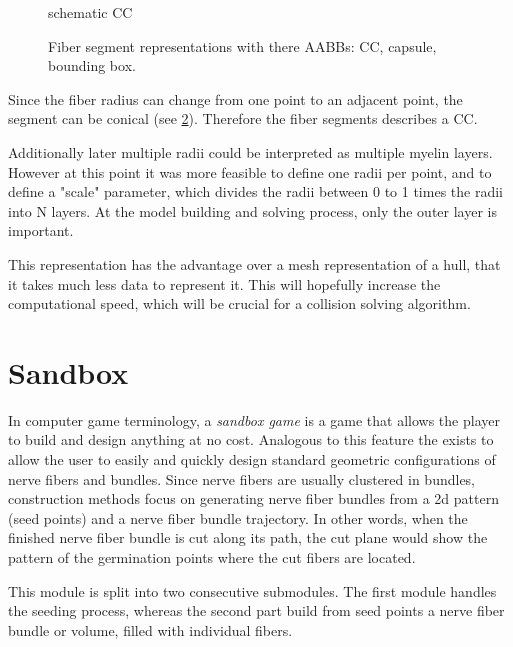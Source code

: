 % 
\begin{figure}[!t]
    \centering
    \setlength{\tikzwidth}{0.5\textwidth}
	\caption{schematic  \ac{CC}}
	\label{fig:conical}
\end{figure}
% 
\begin{figure}[!t]
    \centering
    \setlength{\tikzwidth}{0.75\textwidth}
    \tikzset{external/export=false}
	\caption[cc and co]{Fiber segment representations with there \acp{AABB}:  \ac{CC},  capsule,  bounding box.}
	\label{fig:conical_capsule}
\end{figure}
% 
Since the fiber radius can change from one point to an adjacent point, the segment can be conical (see \cref{fig:conical_capsule}).
Therefore the fiber segments describes a \ac{CC}.
\par
% 
Additionally later multiple radii could be interpreted as multiple myelin layers.
However at this point it was more feasible to define one radii per point, and to define a "scale" parameter, which divides the radii between 0 to 1 times the radii into N layers.
At the model building and solving process, only the outer layer is important.
\par
% 
This representation has the advantage over a mesh representation of a hull, that it takes much less data to represent it.
This will hopefully increase the computational speed, which will be crucial for a collision solving algorithm.
% 
\section{Sandbox}\label{sec:sandbox}
% 
In computer game terminology, a \textit{sandbox game} is a game that allows the player to build and design anything at no cost.
Analogous to this feature the  exists to allow the user to easily and quickly design standard geometric configurations of nerve fibers and bundles.
Since nerve fibers are usually clustered in bundles, construction methods focus on generating nerve fiber bundles from a 2d pattern (seed points) and a nerve fiber bundle trajectory.
In other words, when the finished nerve fiber bundle is cut along its path, the cut plane would show the pattern of the germination points where the cut fibers are located.
% 
\par
% 
This module is split into two consecutive submodules.
The first module handles the seeding process, whereas the second part build from seed points a nerve fiber bundle or volume, filled with individual fibers.
% 
